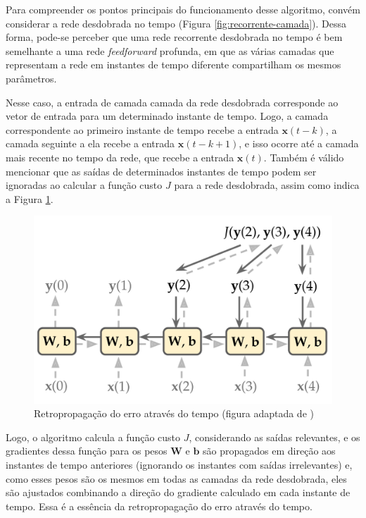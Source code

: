 \documentclass[a4paper, 12pt]{article}
\begin{document}
Para compreender os pontos principais do funcionamento desse algoritmo, convém considerar a rede desdobrada no tempo (Figura \ref{fig:recorrente-camada}). Dessa forma, pode-se perceber que uma rede recorrente desdobrada no tempo é bem semelhante a uma rede \textit{feedforward} profunda, em que as várias camadas que representam a rede em instantes de tempo diferente compartilham os mesmos parâmetros.

Nesse caso, a entrada de camada camada da rede desdobrada corresponde ao vetor de entrada para um determinado instante de tempo. Logo, a camada correspondente ao primeiro instante de tempo recebe a entrada $\mathbf{x}(t-k)$, a camada seguinte a ela recebe a entrada $\mathbf{x}(t-k+1)$, e isso ocorre até a camada mais recente no tempo da rede, que recebe a entrada $\mathbf{x}(t)$. Também é válido mencionar que as saídas de determinados instantes de tempo podem ser ignoradas ao calcular a função custo $J$ para a rede desdobrada, assim como indica a Figura \ref{fig:rnn-backpropagation}.
\begin{figure}[!ht]
\centering
\includegraphics[scale = 0.3]{rnn-backpropagation.pdf}
\caption{Retropropagação do erro através do tempo (figura adaptada de \cite{geron2019hands})}
\label{fig:rnn-backpropagation}
\end{figure}

Logo, o algoritmo calcula a função custo $J$, considerando as saídas relevantes, e os gradientes dessa função para os pesos $\mathbf{W}$ e $\mathbf{b}$ são propagados em direção aos instantes de tempo anteriores (ignorando os instantes com saídas irrelevantes) e, como esses pesos são os mesmos em todas as camadas da rede desdobrada, eles são ajustados combinando a direção do gradiente calculado em cada instante de tempo. Essa é a essência da retropropagação do erro através do tempo.
\end{document}
